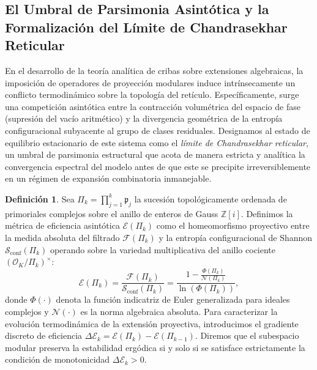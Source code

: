 \documentclass{article}
\numberwithin{equation}{section}
\theoremstyle{plain}
\theoremstyle{definition}
\newtheorem{definicion}[teorema]{Definición}
\begin{document}
\subsection{El Umbral de Parsimonia Asintótica y la Formalización del Límite de Chandrasekhar Reticular}

En el desarrollo de la teoría analítica de cribas sobre extensiones algebraicas, la imposición de operadores de proyección modulares induce intrínsecamente un conflicto termodinámico sobre la topología del retículo. Específicamente, surge una competición asintótica entre la contracción volumétrica del espacio de fase (supresión del vacío aritmético) y la divergencia geométrica de la entropía configuracional subyacente al grupo de clases residuales. Designamos al estado de equilibrio estacionario de este sistema como el \textit{límite de Chandrasekhar reticular}, un umbral de parsimonia estructural que acota de manera estricta y analítica la convergencia espectral del modelo antes de que este se precipite irreversiblemente en un régimen de expansión combinatoria inmanejable.

\begin{definicion}
Sea $\Pi_k = \prod_{j=1}^k \mathfrak{p}_j$ la sucesión topológicamente ordenada de primoriales complejos sobre el anillo de enteros de Gauss $\mathbb{Z}[i]$. Definimos la métrica de eficiencia asintótica $\mathcal{E}(\Pi_k)$ como el homeomorfismo proyectivo entre la medida absoluta del filtrado $\mathcal{F}(\Pi_k)$ y la entropía configuracional de Shannon $\mathcal{S}_{\mathrm{conf}}(\Pi_k)$ operando sobre la variedad multiplicativa del anillo cociente $(\mathcal{O}_K/\Pi_k)^\times$:
\begin{equation}
    \mathcal{E}(\Pi_k) = \frac{\mathcal{F}(\Pi_k)}{\mathcal{S}_{\mathrm{conf}}(\Pi_k)} = \frac{1 - \frac{\Phi(\Pi_k)}{\mathcal{N}(\Pi_k)}}{\ln(\Phi(\Pi_k))},
\end{equation}
donde $\Phi(\cdot)$ denota la función indicatriz de Euler generalizada para ideales complejos y $\mathcal{N}(\cdot)$ es la norma algebraica absoluta. 
Para caracterizar la evolución termodinámica de la extensión proyectiva, introducimos el gradiente discreto de eficiencia $\Delta \mathcal{E}_k = \mathcal{E}(\Pi_{k}) - \mathcal{E}(\Pi_{k-1})$. Diremos que el subespacio modular preserva la estabilidad ergódica si y solo si se satisface estrictamente la condición de monotonicidad $\Delta \mathcal{E}_k > 0$.
\end{definicion}
\end{document}
